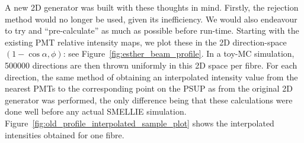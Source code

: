 A new 2D generator was built with these thoughts in mind. Firstly, the rejection method would no longer be used, given its inefficiency. We would also endeavour to try and ``pre-calculate'' as much as possible before run-time. Starting with the existing PMT relative intensity maps, we plot these in the 2D direction-space $(1-\cos\alpha, \phi)$: see Figure~\ref{fig:esther_beam_profile}. In a toy-MC simulation, \num{500000} directions are then thrown uniformly in this 2D space per fibre. For each direction, the same method of obtaining an interpolated intensity value from the nearest PMTs to the corresponding point on the PSUP as from the original 2D generator was performed, the only difference being that these calculations were done well before any actual SMELLIE simulation. Figure~\ref{fig:old_profile_interpolated_sample_plot} shows the interpolated intensities obtained for one fibre.

